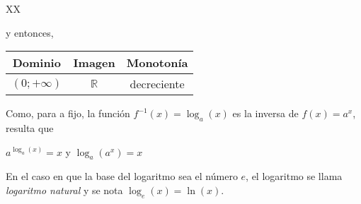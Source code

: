 \documentclass[Análisis.root.tex]{subfiles}
\newcommand{\R}{\mathbb{R}}
\begin{document}
\begin{tabularx}{\textwidth}{XX}
\begin{center}
\begin{tikzpicture}
                    \begin{axis}[
                        scale=0.8,
                        axis lines = middle,
                        axis equal,
                        xlabel = \(x\),
                        ylabel = {\(y\)},
                        domain=-5:5,
                        samples= 100,
                        ymin=-2,
                        ymax=4
                    ]
                    \addplot[color=blue] {Log(0.5,\x)};
                    \addlegendentry{\(\log_\frac{1}{2}(x)\)}
                    \end{axis}
                \end{tikzpicture} 
            \end{center} y entonces,
            \begin{center}
                \begin{tabular}{|c|c|c|}
                    \hline
                    Dominio & Imagen & Monotonía\\\hline
                    \((0;+\infty)\) & \(\R\) & decreciente\\
                    \hline
                \end{tabular}
            \end{center}
        \end{tabularx}
        Como, para a fijo, la función \(f^{−1}(x) = \log_a(x)\) es la inversa de \(f(x) = a^x\), resulta que
        \begin{center}
           \(a^{\log_a(x)}=x\) y \(\log_a(a^x)=x\)
        \end{center}
        En el caso en que la base del logaritmo sea el número \(e\), el logaritmo se llama \textit{logaritmo natural} y se nota \(\log_e(x) = \ln(x)\).
\end{document}
